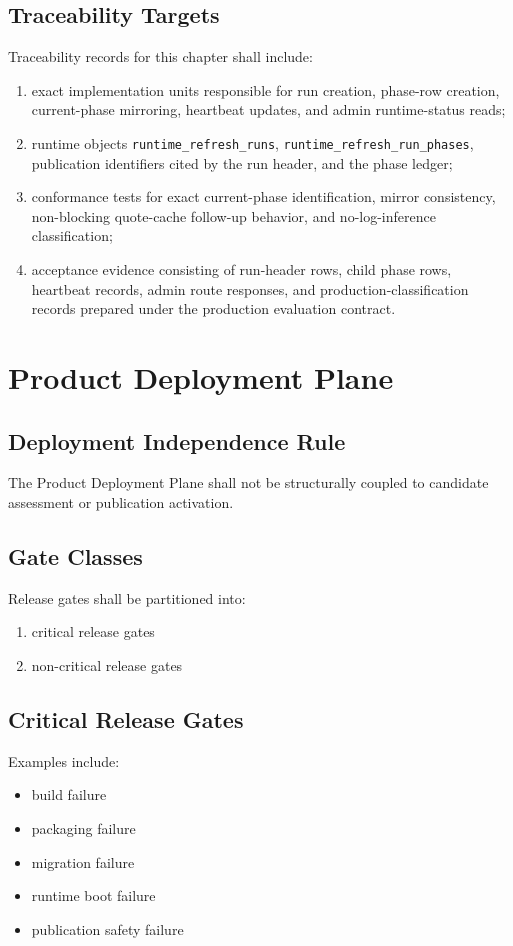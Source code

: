 \documentclass[11pt]{report}
\begin{document}
\section{Traceability Targets}
Traceability records for this chapter shall include:
\begin{enumerate}[leftmargin=1.2cm]
    \item exact implementation units responsible for run creation, phase-row creation, current-phase mirroring, heartbeat updates, and admin runtime-status reads;
    \item runtime objects \texttt{runtime\_refresh\_runs}, \texttt{runtime\_refresh\_run\_phases}, publication identifiers cited by the run header, and the phase ledger;
    \item conformance tests for exact current-phase identification, mirror consistency, non-blocking quote-cache follow-up behavior, and no-log-inference classification;
    \item acceptance evidence consisting of run-header rows, child phase rows, heartbeat records, admin route responses, and production-classification records prepared under the production evaluation contract.
\end{enumerate}

\chapter{Product Deployment Plane}
\section{Deployment Independence Rule}
The Product Deployment Plane shall not be structurally coupled to candidate assessment or publication activation.

\section{Gate Classes}
Release gates shall be partitioned into:
\begin{enumerate}[leftmargin=1.2cm]
    \item critical release gates
    \item non-critical release gates
\end{enumerate}

\section{Critical Release Gates}
Examples include:
\begin{itemize}
    \item build failure
    \item packaging failure
    \item migration failure
    \item runtime boot failure
    \item publication safety failure
\end{itemize}
\end{document}
